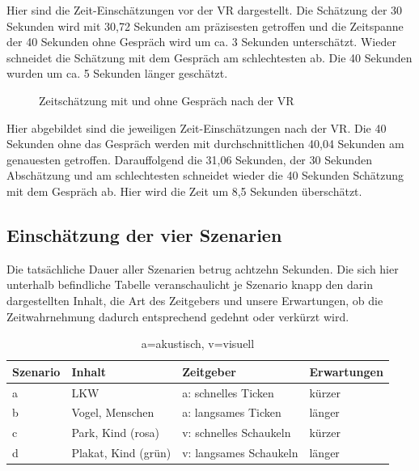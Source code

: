 \documentclass{Paper}
\begin{document}
Hier sind die Zeit-Einschätzungen vor der VR dargestellt.
Die Schätzung der 30 Sekunden wird mit 30,72 Sekunden am präzisesten getroffen und die Zeitspanne der 40 Sekunden ohne Gespräch wird um ca. 3 Sekunden unterschätzt. Wieder schneidet die Schätzung mit dem Gespräch am schlechtesten ab. Die 40 Sekunden wurden um ca. 5 Sekunden länger geschätzt. 
 

\begin{figure}[H]
\caption{Zeitschätzung mit und ohne Gespräch nach der VR}
\label{ZeitNachVR}
\end{figure}

Hier abgebildet sind die jeweiligen Zeit-Einschätzungen nach der VR. 
Die 40 Sekunden ohne das Gespräch werden mit durchschnittlichen 40,04 Sekunden am genauesten getroffen. Darauffolgend die 31,06 Sekunden, der 30 Sekunden Abschätzung und am schlechtesten schneidet wieder die 40 Sekunden Schätzung mit dem Gespräch ab. Hier wird die Zeit um 8,5 Sekunden überschätzt.


\subsection{Einschätzung der vier Szenarien}
\newpage
Die tatsächliche Dauer aller Szenarien betrug achtzehn Sekunden. Die sich hier unterhalb befindliche Tabelle veranschaulicht je Szenario knapp den darin dargestellten Inhalt, die Art des Zeitgebers und unsere Erwartungen, ob die Zeitwahrnehmung dadurch entsprechend gedehnt oder verkürzt wird.
\begin{table}[H]
\centering
\begin{tabular}{llll}
	\hline
	\textbf{Szenario} & \textbf{Inhalt} & \textbf{Zeitgeber}& \textbf{Erwartungen} \\
	\hline
	a & LKW & a: schnelles Ticken & kürzer \\
	b & Vogel, Menschen & a: langsames Ticken & länger\\
	c & Park, Kind (rosa) & v: schnelles Schaukeln & kürzer\\
	d & Plakat, Kind (grün) & v: langsames Schaukeln & länger \\
	\hline
\end{tabular}
\caption{a=akustisch, v=visuell}
\label{AkVis}
\end{table}
\end{document}
